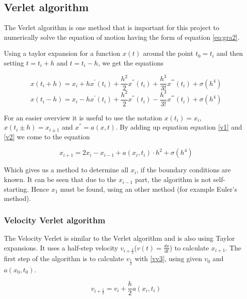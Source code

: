 \documentclass[10pt,a4paper]{article}
\begin{document}
\subsection{Verlet algorithm}

The Verlet algorithm is one method that is important for this project to numerically solve the equation of motion having the form of equation \eqref{eq:gra2}. 

Using a taylor expansion for a function $x(t)$ around the point $t_0 = t_i$ and then setting $t = t_i + h$ and $t = t_i - h$, we get the equations

\begin{equation}
\label{v1}
x(t_i + h) = x_i + h  x^{'}(t_i) + \frac{h^2}{2}  x^{''}(t_i) + \frac{h^3}{3!}  x^{'''}(t_i) + \sigma (h^4)
\end{equation}
\begin{equation}
\label{v2}
x(t_i - h) = x_i - h  x^{'}(t_i) + \frac{h^2}{2}  x^{''}(t_i) - \frac{h^3}{3!}  x^{'''}(t_i) + \sigma (h^4)
\end{equation}

For an easier overview it is useful to use the notation $x(t_i) = x_i$, $x(t_i \pm h) = x_{i \pm 1}$ and $x^{''} = a(x, t)$. By adding up equation equation \eqref{v1} and \eqref{v2} we come to the equation

\begin{equation}
\label{v3}
	x_{i+1} = 2 x_i - x_{i-1} + a(x_i, t_i) \cdot h^2 + \sigma(h^4)
\end{equation}

Which gives us a method to determine all $x_i$, if the boundary conditions are known. It can be seen that due to the $x_{i-1}$ part, the algorithm is not self-starting. Hence $x_1$ must be found, using an other method (for example Euler's method).

\subsubsection{Velocity Verlet algorithm}

The Velocity Verlet is similar to the Verlet algorithm and is also using Taylor expansions. It uses a half-step velocity $v_{i+\frac{1}{2}}$($v(t) = \frac{dx}{dt}$) to calculate $x_{i+1}$. The first step of the algorithm is to calculate $v_{\frac{1}{2}}$ with \eqref{vv3}, using given $v_0$ and $a(x_0, t_0)$.

\begin{equation}
	\label{vv3}
	v_{i + \frac{1}{2}} = v_i + \frac{h}{2} a(x_i, t_i)
\end{equation}
\end{document}
